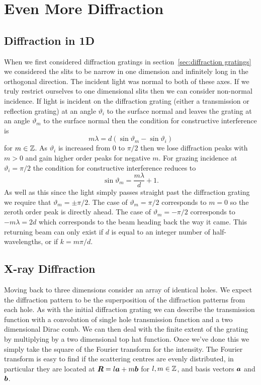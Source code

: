 \documentclass[a4paper]{article}
\begin{document}
    \section{Even More Diffraction}
    \subsection{Diffraction in 1D}
    When we first considered diffraction gratings in section~\ref{sec:diffraction gratings} we considered the slits to be narrow in one dimension and infinitely long in the orthogonal direction.
    The incident light was normal to both of these axes.
    If we truly restrict ourselves to one dimensional slits then we can consider non-normal incidence.
    If light is incident on the diffraction grating (either a transmission or reflection grating) at an angle \(\vartheta_i\) to the surface normal and leaves the grating at an angle \(\vartheta_m\) to the surface normal then the condition for constructive interference is
    \[m\lambda = d(\sin\vartheta_m - \sin\vartheta_i)\]
    for \(m\in\mathbb{Z}\).
    As \(\vartheta_i\) is increased from 0 to \(\pi/2\) then we lose diffraction peaks with \(m > 0\) and gain higher order peaks for negative \(m\).
    For grazing incidence at \(\vartheta_i = \pi/2\) the condition for constructive interference reduces to
    \[\sin\vartheta_m = \frac{m\lambda}{d} + 1.\]
    As well as this since the light simply passes straight past the diffraction grating we require that \(\vartheta_m = \pm \pi/2\).
    The case of \(\vartheta_m = \pi/2\) corresponds to \(m = 0\) so the zeroth order peak is directly ahead.
    The case of \(\vartheta_m = -\pi/2\) corresponds to \(-m\lambda = 2d\) which corresponds to the beam heading back the way it came.
    This returning beam can only exist if \(d\) is equal to an integer number of half-wavelengths, or if \(k = m\pi/d\).
    
    \subsection{X-ray Diffraction}
    Moving back to three dimensions consider an array of identical holes.
    We expect the diffraction pattern to be the superposition of the diffraction patterns from each hole.
    As with the initial diffraction grating we can describe the transmission function with a convolution of single hole transmission function and a two dimensional Dirac comb.
    We can then deal with the finite extent of the grating by multiplying by a two dimensional top hat function.
    Once we've done this we simply take the square of the Fourier transform for the intensity.
    The Fourier transform is easy to find if the scattering centres are evenly distributed, in particular they are located at \(\bm{R} = l\bm{a} + m\bm{b}\) for \(l, m\in\mathbb{Z}\), and basis vectors \(\bm{a}\) and \(\bm{b}\).
    
\end{document}
